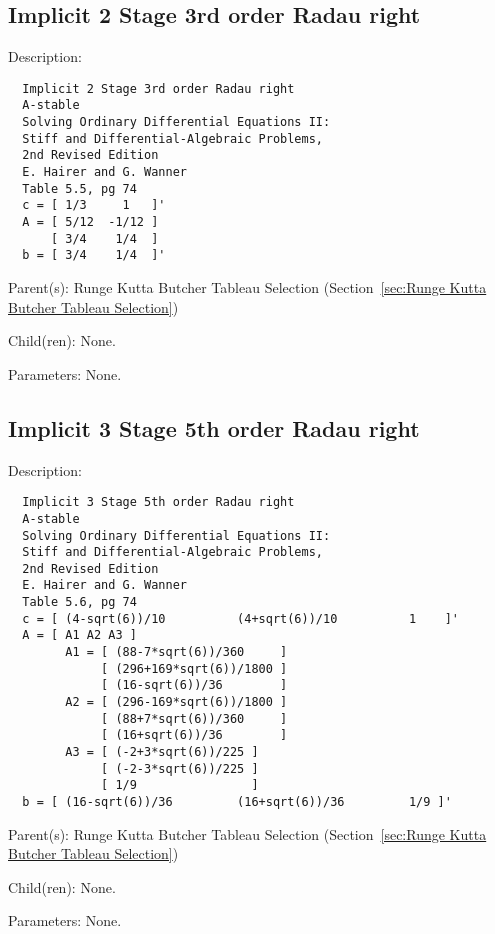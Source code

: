 \subsection{Implicit 2 Stage 3rd order Radau right}
\label{sec:Implicit 2 Stage 3rd order Radau right}

\begin{list}{}
  {\setlength{\leftmargin}{1.0in}
   \setlength{\labelwidth}{0.75in}
   \setlength{\labelsep}{0.125in}}
  \item[Description:]
\begin{verbatim}
  Implicit 2 Stage 3rd order Radau right
  A-stable
  Solving Ordinary Differential Equations II:
  Stiff and Differential-Algebraic Problems,
  2nd Revised Edition
  E. Hairer and G. Wanner
  Table 5.5, pg 74
  c = [ 1/3     1   ]'
  A = [ 5/12  -1/12 ]
      [ 3/4    1/4  ]
  b = [ 3/4    1/4  ]'
\end{verbatim}
  \item[Parent(s):]
    Runge Kutta Butcher Tableau Selection (Section~\ref{sec:Runge Kutta Butcher Tableau Selection})
  \item[Child(ren):]
    None. 
  \item[Parameters:]
    None. 
\end{list}

\subsection{Implicit 3 Stage 5th order Radau right}
\label{sec:Implicit 3 Stage 5th order Radau right}

\begin{list}{}
  {\setlength{\leftmargin}{1.0in}
   \setlength{\labelwidth}{0.75in}
   \setlength{\labelsep}{0.125in}}
  \item[Description:]
\begin{verbatim}
  Implicit 3 Stage 5th order Radau right
  A-stable
  Solving Ordinary Differential Equations II:
  Stiff and Differential-Algebraic Problems,
  2nd Revised Edition
  E. Hairer and G. Wanner
  Table 5.6, pg 74
  c = [ (4-sqrt(6))/10          (4+sqrt(6))/10          1    ]'
  A = [ A1 A2 A3 ]
        A1 = [ (88-7*sqrt(6))/360     ]
             [ (296+169*sqrt(6))/1800 ]
             [ (16-sqrt(6))/36        ]
        A2 = [ (296-169*sqrt(6))/1800 ]
             [ (88+7*sqrt(6))/360     ]
             [ (16+sqrt(6))/36        ]
        A3 = [ (-2+3*sqrt(6))/225 ]
             [ (-2-3*sqrt(6))/225 ]
             [ 1/9                ]
  b = [ (16-sqrt(6))/36         (16+sqrt(6))/36         1/9 ]'
\end{verbatim}
  \item[Parent(s):]
    Runge Kutta Butcher Tableau Selection (Section~\ref{sec:Runge Kutta Butcher Tableau Selection})
  \item[Child(ren):]
    None. 
  \item[Parameters:]
    None. 
\end{list}

